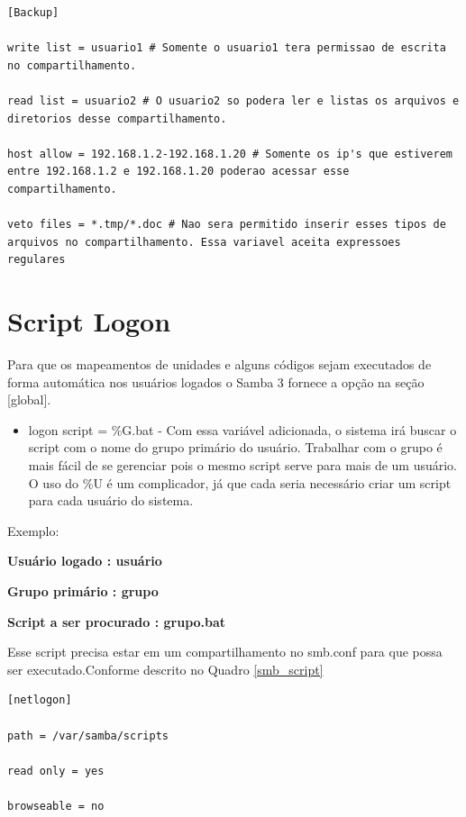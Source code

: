 \begin{lstlisting}[caption=Aplicação de algumas variáveis no Samba 3,label={smb_variavel}]
[Backup]

write list = usuario1 # Somente o usuario1 tera permissao de escrita no compartilhamento.

read list = usuario2 # O usuario2 so podera ler e listas os arquivos e diretorios desse compartilhamento.

host allow = 192.168.1.2-192.168.1.20 # Somente os ip's que estiverem entre 192.168.1.2 e 192.168.1.20 poderao acessar esse compartilhamento.

veto files = *.tmp/*.doc # Nao sera permitido inserir esses tipos de arquivos no compartilhamento. Essa variavel aceita expressoes regulares
\end{lstlisting}

\section{Script Logon}

Para que os mapeamentos de unidades e alguns códigos sejam executados de forma automática nos usuários logados o Samba 3 fornece a opção na seção [global]. 

\begin{itemize}
	\item {logon script = \%G.bat } - Com essa variável adicionada, o sistema irá buscar o script com o nome do grupo primário do usuário. Trabalhar com o grupo é mais fácil de se gerenciar pois o mesmo script serve para mais de um usuário. O uso do \%U é um complicador, já que cada seria necessário criar um script para cada usuário do sistema.
\end{itemize}

Exemplo: 

\textbf{Usuário logado : usuário}

\textbf{Grupo primário : grupo}

\textbf{Script a ser procurado : grupo.bat}

Esse script precisa estar em um compartilhamento no smb.conf para que possa ser executado.Conforme descrito no Quadro \ref{smb_script} \\

\begin{lstlisting}[caption=Compartilhamento dos \textit{scripts} de \textit{logon},label={smb_script}]
[netlogon] 

path = /var/samba/scripts 

read only = yes 

browseable = no	

\end{lstlisting}

